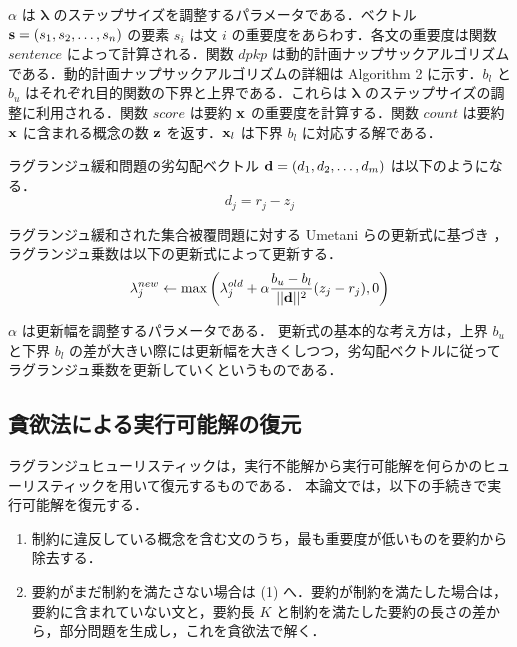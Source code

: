 \documentclass[japanese]{jnlp_1.4}
\begin{document}
$\alpha $ は $\boldsymbol{\lambda}$ のステップサイズを調整するパラメータである．ベクトル $ {\bf s} = (s_{1}, s_{2}, \ldots, s_{n}) $ の要素 $ s_{i} $ は文 $ i $ の重要度をあらわす．各文の重要度は関数 $\mathit{sentence}$ によって計算される．関数 $\mathit{dpkp}$ は動的計画ナップサックアルゴリズムである．動的計画ナップサックアルゴリズムの詳細は Algorithm 2 に示す．$ b_{l} $ と $ b_{u} $ はそれぞれ目的関数の下界と上界である．これらは $\boldsymbol{\lambda}$ のステップサイズの調整に利用される．関数 $\mathit{score}$ は要約 $ {\bf x} $ の重要度を計算する．関数 $\mathit{count}$ は要約 $ {\bf x} $ に含まれる概念の数 $ {\bf z} $ を返す．$ {\bf x}_{l} $ は下界 $ b_{l} $ に対応する解である．

ラグランジュ緩和問題の劣勾配ベクトル $ {\bf d} = (d_{1}, d_{2}, \ldots, d_{m}) $ は以下のようになる．
\begin{equation}
d_{j} = r_{j} - z_{j}
\end{equation}


ラグランジュ緩和された集合被覆問題に対する Umetani らの更新式に基づき \cite{umetani07}，ラグランジュ乗数は以下の更新式によって更新する．
\begin{equation}
 \lambda_{j}^{new} \leftarrow \max \left( \lambda_{j}^{old} + \alpha \frac{ b_{u} - b_{l} }{||{\bf d}||^{2}} (z_{j} - r_{j}), 0 \right)
\end{equation}

$ \alpha $ は更新幅を調整するパラメータである．
更新式の基本的な考え方は，上界 $ b_{u} $ と下界 $ b_{l} $ の差が大きい際には更新幅を大きくしつつ，劣勾配ベクトルに従ってラグランジュ乗数を更新していくというものである．



\subsection{貪欲法による実行可能解の復元}

ラグランジュヒューリスティックは，実行不能解から実行可能解を何らかのヒューリスティックを用いて復元するものである．
本論文では，以下の手続きで実行可能解を復元する．

\begin{enumerate}
\item 制約に違反している概念を含む文のうち，最も重要度が低いものを要約から除去する．
\item 要約がまだ制約を満たさない場合は (1) へ．要約が制約を満たした場合は，要約に含まれていない文と，要約長 $ K $ と制約を満たした要約の長さの差から，部分問題を生成し，これを貪欲法で解く．
\end{enumerate}
\end{document}
